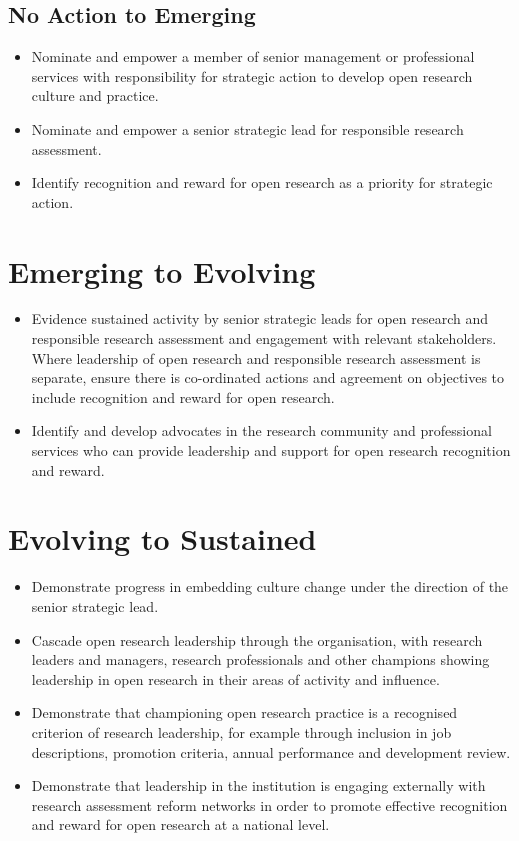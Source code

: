 \documentclass[
  letterpaper,
  DIV=11,
  numbers=noendperiod,
  oneside]{scrreprt}
\begin{document}
\subsection{No Action to Emerging}\label{no-action-to-emerging-1}

\begin{itemize}
\item
  Nominate and empower a member of senior management or professional
  services with responsibility for strategic action to develop open
  research culture and practice.
\item
  Nominate and empower a senior strategic lead for responsible research
  assessment.
\item
  Identify recognition and reward for open research as a priority for
  strategic action.
\end{itemize}

\section{Emerging to Evolving}\label{emerging-to-evolving-1}

\begin{itemize}
\item
  Evidence sustained activity by senior strategic leads for open
  research and responsible research assessment and engagement with
  relevant stakeholders. Where leadership of open research and
  responsible research assessment is separate, ensure there is
  co-ordinated actions and agreement on objectives to include
  recognition and reward for open research.
\item
  Identify and develop advocates in the research community and
  professional services who can provide leadership and support for open
  research recognition and reward.
\end{itemize}

\section{Evolving to Sustained}\label{evolving-to-sustained-1}

\begin{itemize}
\item
  Demonstrate progress in embedding culture change under the direction
  of the senior strategic lead.
\item
  Cascade open research leadership through the organisation, with
  research leaders and managers, research professionals and other
  champions showing leadership in open research in their areas of
  activity and influence.
\item
  Demonstrate that championing open research practice is a recognised
  criterion of research leadership, for example through inclusion in job
  descriptions, promotion criteria, annual performance and development
  review.
\item
  Demonstrate that leadership in the institution is engaging externally
  with research assessment reform networks in order to promote effective
  recognition and reward for open research at a national level.
\end{itemize}
\end{document}

